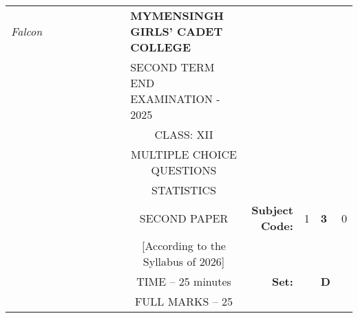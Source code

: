 \documentclass[12pt]{exam}
\begin{document}
\begin{table}[]
\begin{tabular}{llllllllcllll}
\textit{Falcon} &  &  &  &  &  &  &  & \multicolumn{1}{l}{\textbf{MYMENSINGH GIRLS' CADET COLLEGE}} &                                             &                        &                                 &                        \\
                &  &  &  &  &  &  &  & \multicolumn{1}{l}{SECOND TERM END EXAMINATION - 2025}       &                                             &                        & \multicolumn{1}{c}{}            &                        \\
                &  &  &  &  &  &  &  & CLASS: XII                                                   &                                             &                        & \multicolumn{1}{c}{}            &                        \\
                &  &  &  &  &  &  &  & MULTIPLE CHOICE QUESTIONS                                    &                                             &                        & \multicolumn{1}{c}{}            &                        \\
                &  &  &  &  &  &  &  & STATISTICS                                                   &                                             &                        & \multicolumn{1}{r}{}            &                        \\ \cline{11-13} 
                &  &  &  &  &  &  &  & SECOND PAPER                                                 & \multicolumn{1}{r|}{\textbf{Subject Code:}} & \multicolumn{1}{l|}{1} & \multicolumn{1}{l|}{\textbf{3}} & \multicolumn{1}{l|}{0} \\ \cline{11-13} 
                &  &  &  &  &  &  &  & [According to the Syllabus of 2026]                          & \multicolumn{1}{r}{}                        &                        &                                 &                        \\ \cline{12-12}
                &  &  &  &  &  &  &  & TIME – 25 minutes                                            & \multicolumn{1}{r}{\textbf{Set:}}           & \multicolumn{1}{l|}{}  & \multicolumn{1}{l|}{\textbf{D}} &                        \\ \cline{12-12}
                &  &  &  &  &  &  &  & FULL MARKS – 25                                              &                                             &                        &                                 &                       
\end{tabular}
\end{table}
\end{document}
